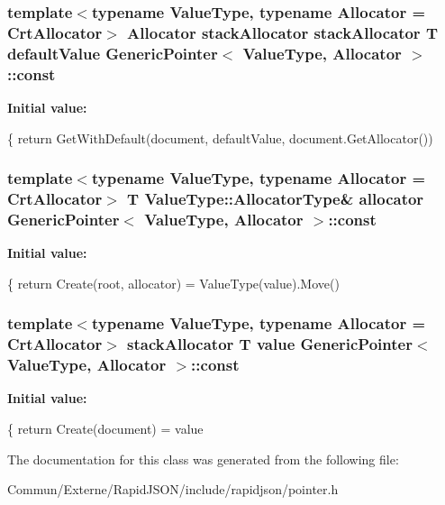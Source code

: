 \subsubsection[{\texorpdfstring{const}{const}}]{\setlength{\rightskip}{0pt plus 5cm}template$<$typename Value\+Type, typename Allocator = Crt\+Allocator$>$ Allocator stack\+Allocator stack\+Allocator T default\+Value {\bf Generic\+Pointer}$<$ Value\+Type, Allocator $>$\+::const}\hypertarget{class_generic_pointer_ad6e06cd83cf52e045c7e07a67078e973}{}\label{class_generic_pointer_ad6e06cd83cf52e045c7e07a67078e973}
{\bfseries Initial value\+:}
\begin{DoxyCode}
\{
        \textcolor{keywordflow}{return} GetWithDefault(document, defaultValue, document.GetAllocator())
\end{DoxyCode}
\subsubsection[{\texorpdfstring{const}{const}}]{\setlength{\rightskip}{0pt plus 5cm}template$<$typename Value\+Type, typename Allocator = Crt\+Allocator$>$ T Value\+Type\+::\+Allocator\+Type\& allocator {\bf Generic\+Pointer}$<$ Value\+Type, Allocator $>$\+::const}\hypertarget{class_generic_pointer_ace82428d4ad958b05a52480d949b32fa}{}\label{class_generic_pointer_ace82428d4ad958b05a52480d949b32fa}
{\bfseries Initial value\+:}
\begin{DoxyCode}
\{
        \textcolor{keywordflow}{return} Create(root, allocator) = ValueType(value).Move()
\end{DoxyCode}
\subsubsection[{\texorpdfstring{const}{const}}]{\setlength{\rightskip}{0pt plus 5cm}template$<$typename Value\+Type, typename Allocator = Crt\+Allocator$>$ stack\+Allocator T value {\bf Generic\+Pointer}$<$ Value\+Type, Allocator $>$\+::const}\hypertarget{class_generic_pointer_abb1b141cfe93b7159842b5cad60d1be3}{}\label{class_generic_pointer_abb1b141cfe93b7159842b5cad60d1be3}
{\bfseries Initial value\+:}
\begin{DoxyCode}
\{
            \textcolor{keywordflow}{return} Create(document) = value
\end{DoxyCode}


The documentation for this class was generated from the following file\+:\begin{DoxyCompactItemize}
\item 
Commun/\+Externe/\+Rapid\+J\+S\+O\+N/include/rapidjson/pointer.\+h\end{DoxyCompactItemize}
